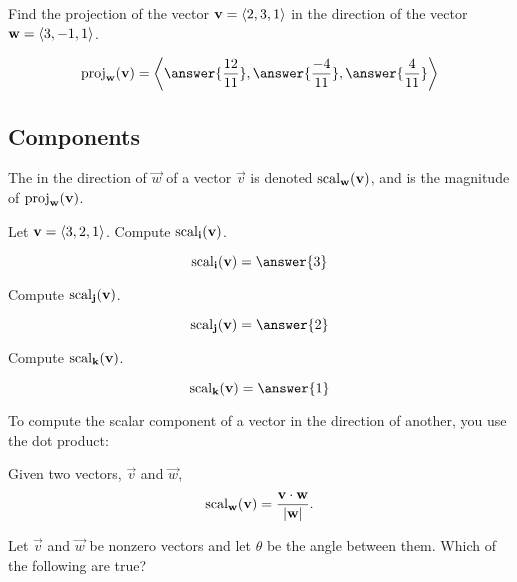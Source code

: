 \documentclass{ximera}
\begin{document}
\begin{question}
  Find the projection of the vector $\mathbf{v} = \left\langle 2,3,1\right\rangle$ in the
  direction of the vector $\mathbf{w} = \left\langle 3,-1,1\right\rangle$.
  \begin{prompt}
  \[
  \proj_\vec{w}(\vec{v}) = \vector{\answer{\frac{12}{11}},\answer{\frac{-4}{11}},\answer{\frac{4}{11}}}
  \]
  \end{prompt}
\end{question}

\subsection{Components}

\begin{definition}
  The  in the direction of
  $\vec{w}$ of a vector $\vec{v}$ is denoted $\operatorname{scal}_\mathbf{w}(\mathbf{v})$,
  and is the magnitude of $\operatorname{proj}_\mathbf{w}(\mathbf{v})$.
\end{definition}

\begin{question}
  Let $\mathbf{v} = \left\langle 3,2,1\right\rangle$. Compute $\operatorname{scal}_{\mathbf{i}}(\mathbf{v})$.
  \begin{prompt}
    \[
    \scal_\veci(\vec{v}) = \answer{3}
    \]
  \end{prompt}
  \begin{question}
    Compute $\operatorname{scal}_{\mathbf{j}}(\mathbf{v})$.
    \begin{prompt}
      \[
      \scal_\vecj(\vec{v}) = \answer{2}
      \]
    \end{prompt}
    \begin{question}
      Compute $\operatorname{scal}_{\mathbf{k}}(\mathbf{v})$.
      \begin{prompt}
        \[
        \scal_\veck(\vec{v}) = \answer{1}
        \]
      \end{prompt}
    \end{question}
  \end{question}
\end{question}
To compute the scalar component of a vector in the direction of
another, you use the dot product:

\begin{theorem}
  Given two vectors, $\vec{v}$ and $\vec{w}$,
  \[
  \operatorname{scal}_\mathbf{w}(\mathbf{v}) =\frac{\mathbf{v} \cdot \mathbf{w}}{|\mathbf{w}|}.
  \]
\end{theorem}

\begin{question}
  Let $\vec{v}$ and $\vec{w}$ be nonzero vectors and let $\theta$ be
  the angle between them. Which of the following are true?
  \begin{selectAll}
  \end{selectAll}
\end{question}
\end{document}
